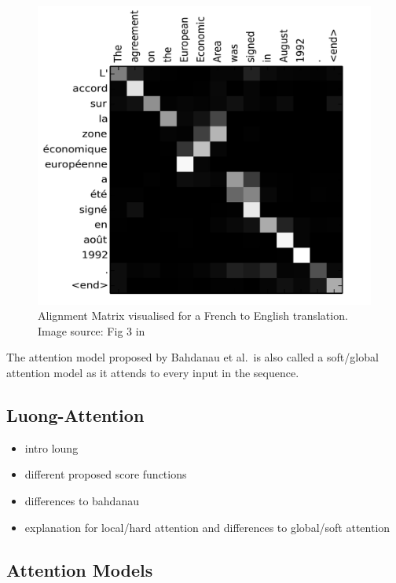 \documentclass[]{krantz}
\begin{document}
\begin{figure}
\centering
\includegraphics{./figures/02-02-attention-and-self-attention-for-nlp/bahdanau-fig3.png}
\caption{Alignment Matrix visualised for a French to English translation. Image source: Fig 3 in \citet{bahdanau2014neural}}
\end{figure}

The attention model proposed by Bahdanau et al.~is also called a soft/global attention model as it attends
to every input in the sequence.

\hypertarget{luong-attention}{%
\subsection{Luong-Attention}\label{luong-attention}}

\begin{itemize}
\item
  intro loung
\item
  different proposed score functions
\item
  differences to bahdanau
\item
  explanation for local/hard attention and differences to global/soft attention
\end{itemize}

\hypertarget{attention-models}{%
\subsection{Attention Models}\label{attention-models}}
\end{document}
